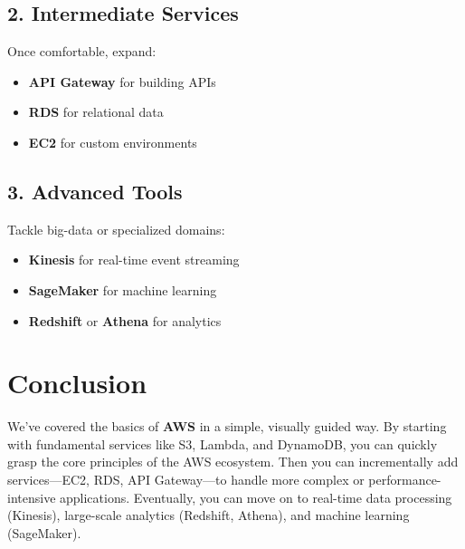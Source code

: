 \documentclass[11pt]{article}
\begin{document}
\subsection{2. Intermediate Services}
Once comfortable, expand:
\begin{itemize}
    \item \textbf{API Gateway} for building APIs
    \item \textbf{RDS} for relational data
    \item \textbf{EC2} for custom environments
\end{itemize}

\subsection{3. Advanced Tools}
Tackle big-data or specialized domains:
\begin{itemize}
    \item \textbf{Kinesis} for real-time event streaming
    \item \textbf{SageMaker} for machine learning
    \item \textbf{Redshift} or \textbf{Athena} for analytics
\end{itemize}

\begin{center}
\end{center}

\clearpage

\section*{Conclusion}

We’ve covered the basics of \textbf{AWS} in a simple, visually guided way. By starting with fundamental services like S3, Lambda, and DynamoDB, you can quickly grasp the core principles of the AWS ecosystem. Then you can incrementally add services---EC2, RDS, API Gateway---to handle more complex or performance-intensive applications. Eventually, you can move on to real-time data processing (Kinesis), large-scale analytics (Redshift, Athena), and machine learning (SageMaker).
\end{document}
